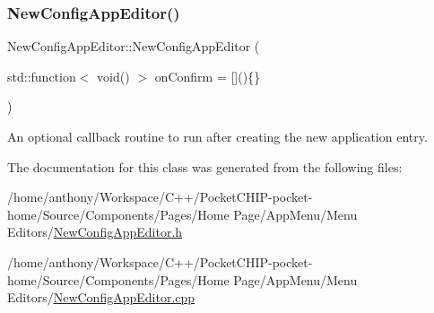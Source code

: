 \subsubsection{\texorpdfstring{New\+Config\+App\+Editor()}{NewConfigAppEditor()}}
{\footnotesize\ttfamily New\+Config\+App\+Editor\+::\+New\+Config\+App\+Editor (\begin{DoxyParamCaption}\item[{std\+::function$<$ void() $>$}]{on\+Confirm = {\ttfamily \mbox{[}\mbox{]}()\{\}} }\end{DoxyParamCaption})}

An optional callback routine to run after creating the new application entry. 

The documentation for this class was generated from the following files\+:\begin{DoxyCompactItemize}
\item 
/home/anthony/\+Workspace/\+C++/\+Pocket\+C\+H\+I\+P-\/pocket-\/home/\+Source/\+Components/\+Pages/\+Home Page/\+App\+Menu/\+Menu Editors/\mbox{\hyperlink{NewConfigAppEditor_8h}{New\+Config\+App\+Editor.\+h}}\item 
/home/anthony/\+Workspace/\+C++/\+Pocket\+C\+H\+I\+P-\/pocket-\/home/\+Source/\+Components/\+Pages/\+Home Page/\+App\+Menu/\+Menu Editors/\mbox{\hyperlink{NewConfigAppEditor_8cpp}{New\+Config\+App\+Editor.\+cpp}}\end{DoxyCompactItemize}
